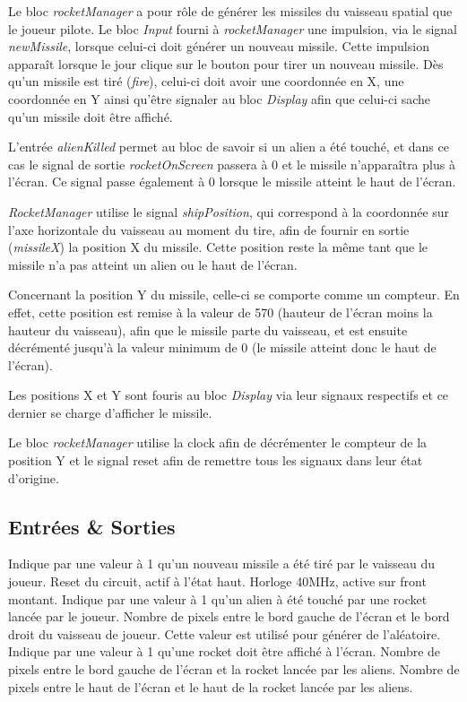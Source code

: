 \documentclass[french]{nakrule}
\begin{document}
Le bloc \emph{rocketManager} a pour rôle de générer les missiles du vaisseau
spatial que le joueur pilote. Le bloc \emph{Input} fourni à \emph{rocketManager}
une impulsion, via le signal \emph{newMissile}, lorsque celui-ci doit générer un
nouveau missile. Cette impulsion apparaît lorsque le jour clique sur le bouton
pour tirer un nouveau missile. Dès qu'un missile est tiré (\emph{fire}), celui-ci doit avoir
une coordonnée en X, une coordonnée en Y ainsi qu'être signaler au bloc
\emph{Display} afin que celui-ci sache qu'un missile doit être affiché.

L'entrée \emph{alienKilled} permet au bloc de savoir si un alien a été touché,
et dans ce cas le signal de sortie \emph{rocketOnScreen} passera à 0 et le
missile n'apparaîtra plus à l'écran. Ce signal passe
également à 0 lorsque le missile atteint le haut de l'écran.

\emph{RocketManager} utilise le signal \emph{shipPosition}, qui correspond à la
coordonnée sur l'axe horizontale du vaisseau au moment du tire, afin de fournir
en sortie (\emph{missileX}) la position X du missile. Cette position reste la
même tant que le missile n'a pas atteint un alien ou le haut de l'écran.

Concernant la position Y du missile, celle-ci se comporte comme un compteur. En
effet, cette position est remise à la valeur de 570 (hauteur de l'écran moins la
hauteur du vaisseau), afin que le missile parte du vaisseau, et est ensuite
décrémenté jusqu'à la valeur minimum de 0 (le missile atteint donc le haut de
l'écran).

Les positions X et Y sont fouris au bloc \emph{Display} via leur signaux
respectifs et ce dernier se charge d'afficher le missile.

Le bloc \emph{rocketManager} utilise la clock afin de décrémenter le compteur de
la position Y et le signal reset afin de remettre tous les signaux dans leur
état d'origine.

\subsection{Entrées \& Sorties}
\label{subsec:Entrées_Sorties_rocketManager}

\begin{descr}
   Indique par une valeur à 1 qu'un nouveau missile a été
  tiré par le vaisseau du joueur.
   Reset du circuit, actif à l'état haut.
   Horloge 40MHz, active sur front montant.
   Indique par une valeur à 1 qu'un alien à été touché
  par une rocket lancée par le joueur.
   Nombre de pixels entre le bord gauche de l'écran et
  le bord droit du vaisseau de joueur. Cette valeur est utilisé pour générer de l'aléatoire.
   Indique par une valeur à 1 qu'une rocket doit être
  affiché à l'écran.
   Nombre de pixels entre le bord gauche de l'écran et la rocket
  lancée par les aliens.
   Nombre de pixels entre le haut de l'écran et le haut de la rocket
  lancée par les aliens.
\end{descr}
\end{document}
